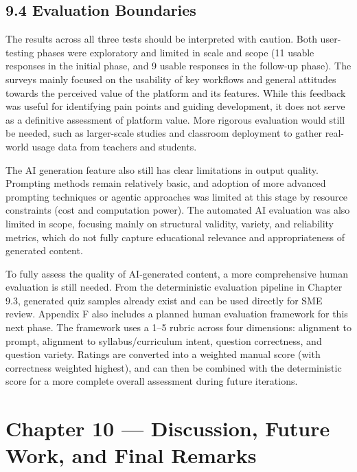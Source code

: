 \documentclass[
  12pt,
  a4paper,
]{report}
\begin{document}
\hypertarget{evaluation-boundaries}{%
\section{9.4 Evaluation Boundaries}\label{evaluation-boundaries}}

The results across all three tests should be interpreted with caution. Both
user-testing phases were exploratory and limited in scale and scope
(11 usable responses in the initial phase, and 9 usable responses in the
follow-up phase). The surveys mainly focused on the usability of key
workflows and general attitudes towards the perceived value of the
platform and its features. While this feedback was useful for
identifying pain points and guiding development, it does not serve as a
definitive assessment of platform value. More rigorous evaluation would
still be needed, such as larger-scale studies and classroom deployment
to gather real-world usage data from teachers and students.

The AI generation feature also still has clear limitations in output
quality. Prompting methods remain relatively basic, and adoption of more
advanced prompting techniques or agentic approaches was limited at this
stage by resource constraints (cost and computation power). The
automated AI evaluation was also limited in scope, focusing mainly on
structural validity, variety, and reliability metrics, which do not
fully capture educational relevance and appropriateness of generated
content.

To fully assess the quality of AI-generated content, a more
comprehensive human evaluation is still needed. From the deterministic
evaluation pipeline in Chapter 9.3, generated quiz samples already exist and can be
used directly for SME review. Appendix F also includes a planned human
evaluation framework for this next phase. The framework uses a 1--5
rubric across four dimensions: alignment to prompt, alignment to
syllabus/curriculum intent, question correctness, and question variety.
Ratings are converted into a weighted manual score (with correctness
weighted highest), and can then be combined with the deterministic score for
a more complete overall assessment during future iterations.


\hypertarget{chapter-11-discussion-limitations-and-future-work}{%
\chapter{Chapter 10 --- Discussion, Future Work, and Final
Remarks}\label{chapter-10-discussion-limitations-and-future-work}}
\end{document}
